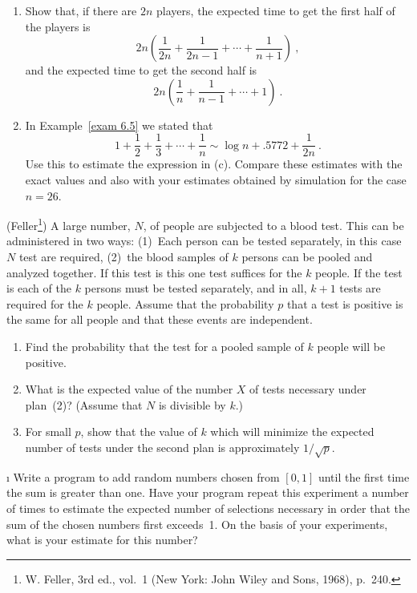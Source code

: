 \begin{LJSItem}
\begin{enumerate}
\item Show that, if there are $2n$ players, the expected time to get the first half
of the players is
$$ 2n \left( \frac 1{2n} + \frac 1{2n - 1} +\cdots+ \frac 1{n + 1} \right)\ ,
$$ and the expected time to get the second half is
$$ 2n \left( \frac 1n + \frac 1{n - 1} +\cdots+ 1 \right)\ .
$$

\item In Example~\ref{exam 6.5} we stated that
$$ 1 + \frac 12 + \frac 13 +\cdots+ \frac 1n \sim \log n + .5772 + \frac 1{2n}\ .
$$ Use this to estimate the expression in (c).  Compare these estimates with the
exact values and also with your estimates obtained by simulation for the case $n =
26$.
\end{enumerate}

\istar\label{exer 6.1.31} (Feller\footnote{W. Feller,   3rd ed., vol.~1 (New York: John Wiley and
Sons, 1968), p.~240.})  A large number, $N$, of people are subjected to a blood
test.  This can be administered in two ways: (1)~Each person can be tested separately, in
this case $N$ test are required, (2)~the blood samples of $k$ persons can be pooled
and analyzed together.  If this test is   this one test suffices for
the $k$ people.  If the test is   each of the $k$ persons must be
tested separately, and in all, $k + 1$ tests are required for the $k$ people.  Assume
that the probability $p$ that a test is positive is the same for all people and that
these events are independent.

\begin{enumerate}
\item Find the probability that the test for a pooled sample of $k$ people will be
positive.

\item What is the expected value of the number $X$ of tests necessary under
plan~(2)?  (Assume that $N$ is divisible by $k$.)

\item For small $p$, show that the value of $k$ which will minimize the expected
number of tests under the second plan is approximately $1/\sqrt p$.
\end{enumerate}

\i\label{exer 6.1.32} Write a program to add random numbers chosen from $[0,1]$
until the first time the sum is greater than one.  Have your program repeat this
experiment a number of times to estimate the expected number of selections necessary
in order that the sum of the chosen numbers first exceeds~1.  On the basis of your
experiments, what is your estimate for this number?


\end{LJSItem}
